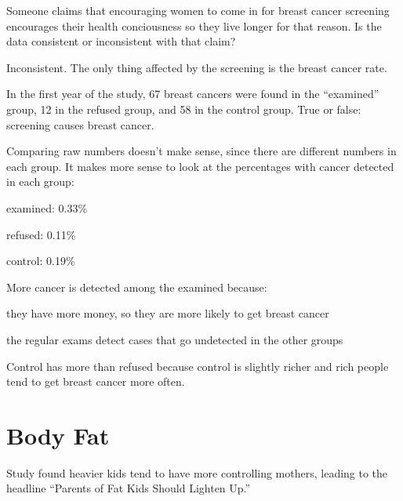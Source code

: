 \documentclass[landscape]{exam}
\begin{document}
\begin{itemize*}
    \item Someone claims that encouraging women to come in for breast cancer
      screening encourages their health conciousness so they live longer for
      that reason.  Is the data consistent or inconsistent with that claim?

      \begin{solution}
        Inconsistent.  The only thing affected by the screening is the breast
        cancer rate.
      \end{solution}

    \item In the first year of the study, 67 breast cancers were found in the
      ``examined'' group, 12 in the refused group, and 58 in the control group.
      True or false: screening causes breast cancer.

      \begin{solution}
        Comparing raw numbers doesn't make sense, since there are different
        numbers in each group.  It makes more sense to look at the percentages
        with cancer detected in each group:
        \begin{itemize*}
          \item examined: 0.33\%
          \item refused: 0.11\%
          \item control: 0.19\%
        \end{itemize*}

        More cancer is detected among the examined because:
        \begin{itemize*}
          \item they have more money, so they are more likely to get breast
            cancer
          \item the regular exams detect cases that go undetected in the other
            groups
        \end{itemize*}

        Control has more than refused because control is slightly richer and
        rich people tend to get breast cancer more often.
      \end{solution}

  \end{itemize*}

  \section{Body Fat}
  Study found heavier kids tend to have more controlling mothers, leading to the
  headline ``Parents of Fat Kids Should Lighten Up.''
\end{document}
